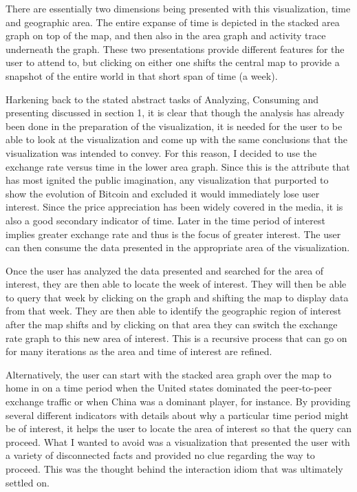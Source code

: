 \documentclass[journal]{vgtc}                %
\begin{document}
There are essentially two dimensions being presented with this visualization, time and geographic area.  The entire expanse of time is depicted in the stacked area graph on top of the map, and then also in the area graph and activity trace underneath the graph.  These two presentations provide different features for the user to attend to, but clicking on either one shifts the central map to provide a snapshot of the entire world in that short span of time (a week).

Harkening back to the stated abstract tasks of Analyzing, Consuming and presenting discussed in section 1, it is clear that though the analysis has already been done in the preparation of the visualization, it is needed for the user to be able to look at the visualization and come up with the same conclusions that the visualization was intended to convey.  For this reason, I decided to use the exchange rate versus time in the lower area graph.  Since this is the attribute that has most ignited the public imagination, any visualization that purported to show the evolution of Bitcoin and excluded it would immediately lose user interest.  Since the price appreciation has been widely covered in the media, it is also a good secondary indicator of time.  Later in the time period of interest implies greater exchange rate and thus is the focus of greater interest.  The user can then consume the data presented in the appropriate area of the visualization.

Once the user has analyzed the data presented and searched for the area of interest, they are then able to locate the week of interest.  They will then be able to query that week by clicking on the graph and shifting the map to display data from that week.  They are then able to identify the geographic region of interest after the map shifts and by clicking on that area they can switch the exchange rate graph to this new area of interest.  This is a recursive process that can go on for many iterations as the area and time of interest are refined.

Alternatively, the user can start with the stacked area graph over the map to home in on a time period when the United states dominated the peer-to-peer exchange traffic or when China was a dominant player, for instance.  By providing several different indicators with details about why a particular time period might be of interest, it helps the user to locate the area of interest so that the query can proceed.  What I wanted to avoid was a visualization that presented the user with a variety of disconnected facts and provided no clue regarding the way to proceed.  This was the thought behind the interaction idiom that was ultimately settled on.
\end{document}

